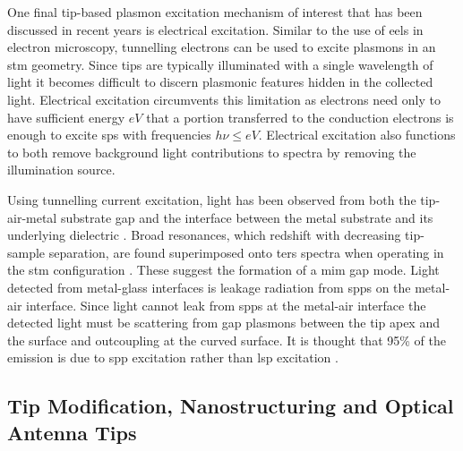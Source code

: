 \documentclass{article}
\begin{document}
One final tip-based plasmon excitation mechanism of interest that has been discussed in recent years is electrical excitation. Similar to the use of \gls{eels} in electron microscopy, tunnelling electrons can be used to excite plasmons in an \gls{stm} geometry. Since tips are typically illuminated with a single wavelength of light it becomes difficult to discern plasmonic features hidden in the collected light. Electrical excitation circumvents this limitation as electrons need only to have sufficient energy $eV$ that a portion transferred to the conduction electrons is enough to excite \glspl{sp} with frequencies $h\nu \leq eV$. Electrical excitation also functions to both remove background light contributions to spectra by removing the illumination source.

Using tunnelling current excitation, light has been observed from both the tip-air-metal substrate gap \cite{pettinger2007, pettinger2009} and the interface between the metal substrate and its underlying dielectric \cite{wang2011}. Broad resonances, which redshift with decreasing tip-sample separation, are found superimposed onto \gls{ters} spectra when operating in the \gls{stm} configuration \cite{pettinger2007, pettinger2009}. These suggest the formation of a \gls{mim} gap mode. Light detected from metal-glass interfaces is leakage radiation from \glspl{spp} on the metal-air interface. Since light cannot leak from \glspl{spp} at the metal-air interface the detected light must be scattering from gap plasmons between the tip apex and the surface {\color{red}and outcoupling at the curved surface}. It is thought that 95\% of the emission is due to \gls{spp} excitation rather than \gls{lsp} excitation \cite{wang2011}.

\subsection{Tip Modification, Nanostructuring and Optical Antenna Tips}
\end{document}
